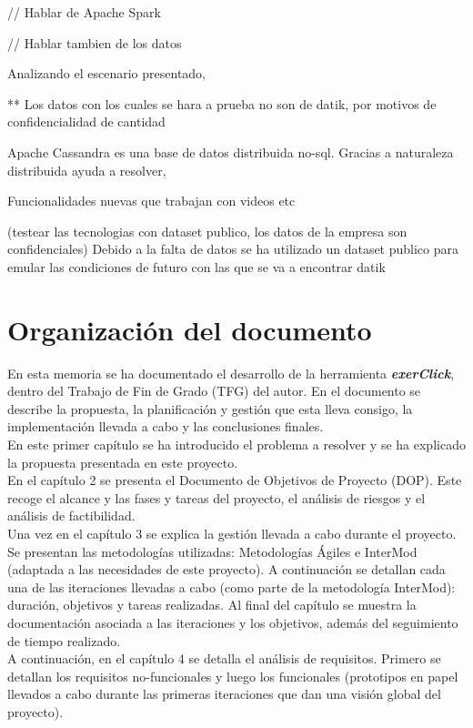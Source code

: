 // Hablar de Apache Spark

// Hablar tambien de los datos

Analizando el escenario presentado, 

** Los datos con los cuales se hara a prueba no son de datik, por motivos de confidencialidad de cantidad

Apache Cassandra es una base de datos distribuida no-sql. Gracias a naturaleza distribuida ayuda a resolver, 

Funcionalidades nuevas que trabajan con videos etc



(testear las tecnologias con dataset publico, los datos de la empresa son confidenciales) Debido a la falta de datos se ha utilizado un dataset publico para emular las condiciones de futuro con las que se va a encontrar datik

\section{Organización del documento}

En esta memoria se ha documentado  el desarrollo de la herramienta \textbf{\textit{exerClick}}, dentro del Trabajo de Fin de Grado (TFG) del autor. En el documento se describe la propuesta, la planificación y gestión que esta lleva consigo, la implementación llevada a cabo y las conclusiones finales.\\

En este primer capítulo se ha introducido el problema a resolver y se ha explicado la propuesta presentada en este proyecto.\\

En el capítulo 2 se presenta el Documento de Objetivos de Proyecto (DOP). Este recoge el alcance y las fases y tareas del proyecto, el análisis de riesgos y el análisis de factibilidad.\\

Una vez en el capítulo 3 se explica la gestión llevada a cabo durante el proyecto. Se presentan las metodologías utilizadas: Metodologías Ágiles e InterMod (adaptada a las necesidades de este proyecto). A continuación se detallan cada una de las iteraciones llevadas a cabo (como parte de la metodología InterMod): duración, objetivos y tareas realizadas. Al final del capítulo se muestra la documentación asociada a las iteraciones y los objetivos, además del seguimiento de tiempo realizado.\\

A continuación, en el capítulo 4 se detalla el análisis de requisitos. Primero se detallan los requisitos no-funcionales y luego los funcionales (prototipos en papel llevados a cabo durante las primeras iteraciones que dan una visión global del proyecto).\\

